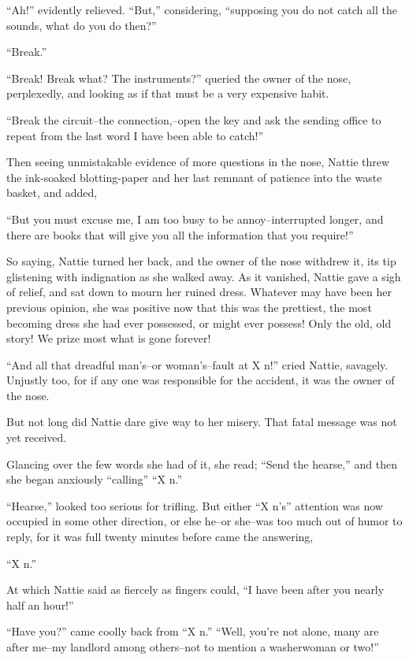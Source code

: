 ``Ah!'' evidently relieved. ``But,'' considering, ``supposing you do not
catch all the sounds, what do you do then?''

``Break.''

``Break! Break what? The instruments?'' queried the owner of the nose,
perplexedly, and looking as if that must be a very expensive habit.

``Break the circuit--the connection,--open the key and ask the sending
office to repeat from the last word I have been able to catch!''

Then seeing unmistakable evidence of more questions in the nose, Nattie
threw the ink-soaked blotting-paper and her last remnant of patience
into the waste basket, and added,

``But you must excuse me, I am too busy to be annoy--interrupted longer,
and there are books that will give you all the information that you
require!''

So saying, Nattie turned her back, and the owner of the nose withdrew
it, its tip glistening with indignation as she walked away. As it
vanished, Nattie gave a sigh of relief, and sat down to mourn her ruined
dress. Whatever may have been her previous opinion, she was positive now
that this was the prettiest, the most becoming dress she had ever
possessed, or might ever possess! Only the old, old story! We prize most
what is gone forever!

``And all that dreadful man's--or woman's--fault at X n!'' cried Nattie,
savagely. Unjustly too, for if any one was responsible for the accident,
it was the owner of the nose.

But not long did Nattie dare give way to her misery. That fatal message
was not yet received.

Glancing over the few words she had of it, she read; ``Send the hearse,''
and then she began anxiously ``calling'' ``X n.''

``Hearse,'' looked too serious for trifling. But either ``X n's''
attention was now occupied in some other direction, or else he--or
she--was too much out of humor to reply, for it was full twenty minutes
before came the answering,

``X n.''

At which Nattie said as fiercely as fingers could, ``I have been after
you nearly half an hour!''

``Have you?'' came coolly back from ``X n.'' ``Well, you're not alone, many
are after me--my landlord among others--not to mention a washerwoman or
two!''


